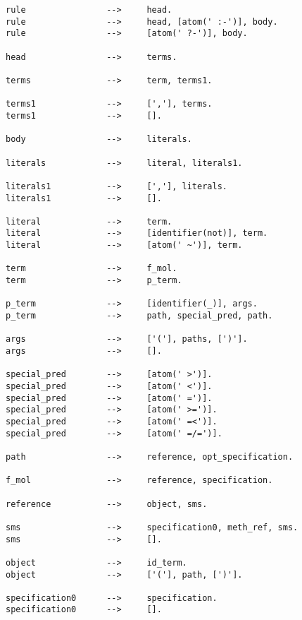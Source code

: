 \begin{figure}[htbp]
\begin{minipage}[t]{.48\textwidth}
{\scriptsize
\begin{verbatim}
rule                -->     head.
rule                -->     head, [atom(' :-')], body.
rule                -->     [atom(' ?-')], body.

head                -->     terms.

terms               -->     term, terms1.

terms1              -->     [','], terms.    
terms1              -->     [].

body                -->     literals.

literals            -->     literal, literals1.

literals1           -->     [','], literals.
literals1           -->     [].

literal             -->     term.
literal             -->     [identifier(not)], term.
literal             -->     [atom(' ~')], term.

term                -->     f_mol.
term                -->     p_term.              
                        
p_term              -->     [identifier(_)], args.
p_term              -->     path, special_pred, path.
                                
args                -->     ['('], paths, [')'].
args                -->     [].

special_pred        -->     [atom(' >')].
special_pred        -->     [atom(' <')].
special_pred        -->     [atom(' =')].
special_pred        -->     [atom(' >=')].
special_pred        -->     [atom(' =<')].
special_pred        -->     [atom(' =/=')].
                                                        
path                -->     reference, opt_specification.

f_mol               -->     reference, specification.

reference           -->     object, sms.
                          
sms                 -->     specification0, meth_ref, sms.
sms                 -->     []. 

object              -->     id_term.            
object              -->     ['('], path, [')'].

specification0      -->     specification.
specification0      -->     [].


\end{verbatim}}
\end{minipage}
\end{figure}
